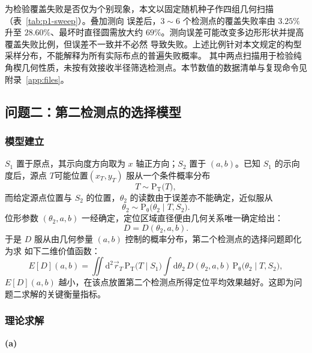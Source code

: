 为检验覆盖失败是否仅为个别现象，本文以固定随机种子作四组几何扫描（表~\ref{tab:p1-sweep}）。叠加测向
误差后，$3\sim6$ 个检测点的覆盖失败率由 $3.25\%$ 升至 $28.60\%$、最坏时直径圆需放大约
$69\%$。测向误差可能改变多边形形状并提高覆盖失败比例，但误差不一致并不必然
导致失败。上述比例针对本文规定的构型采样分布，不能解释为所有实际布点的普遍失败概率。
其中两点扫描用于检验纯角楔几何性质，未按有效接收半径筛选检测点。本节数值的数据清单与复现命令见附录~\ref{app:files}。

\subsection{问题二：第二检测点的选择模型}
\subsubsection{模型建立}
\noindent\hspace{0.2em}{\heiti 记号与概率描述}\songti

$S_1$ 置于原点，其示向度方向取为 $x$ 轴正方向；$S_2$ 置于 $(a,b)$。已知 $S_1$
的示向度后，源点 $T$可能位置$(x_T,y_T)$ 服从一个条件概率分布
\begin{equation}
    T\sim \mathrm{P_{T}}\bigl(T\bigr),
    \label{eq:posterior}
\end{equation}
而给定源点位置与 $S_2$ 的位置，$\theta_2$ 的读数由于误差亦不能确定，近似服从
\begin{equation}
    \theta_2\sim \mathrm{P_{\theta}}\bigl(\theta_2\mid T,S_2\bigr).
    \label{eq:theta2-dist}
\end{equation}
位形参数 $(\theta_2,a,b)$ 一经确定，定位区域直径便由几何关系唯一确定给出：
\begin{equation}
    D=D(\theta_2,a,b).
    \label{eq:D-geometry}
\end{equation}
于是 $D$ 服从由几何参量 $(a,b)$ 控制的概率分布，第二个检测点的选择问题即化为求
如下二维价值函数：
\begin{equation}
    E[D](a,b)=\iint \mathrm{d}^2\vec r_T\,
    \mathrm{P_T}\bigl(T\mid S_1\bigr)
    \int \mathrm{d}\theta_2\,
    D(\theta_2,a,b)\,\mathrm{P_{\theta}}\bigl(\theta_2\mid T,S_2\bigr),
    \label{eq:value-function}
\end{equation}
$E[D](a,b)$ 越小，在该点放置第二个检测点所得定位平均效果越好。这即为问题二求解的关键衡量指标。

\subsubsection{理论求解}
\noindent\textbf{(a)}\hspace{0.2em}{\heiti 理论推导}\songti

